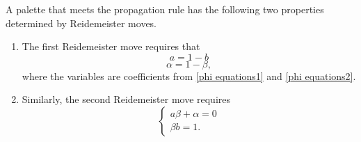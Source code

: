     \begin{lemma}\label{warunki na palete}
  A palette that meets the propagation rule has the following two properties determined by Reidemeister moves.
  \begin{enumerate}
    \item The first Reidemeister move requires that
      $$a=1-b$$
      $$\alpha=1-\beta,$$
      where the variables are coefficients from \eqref{phi equations1} and \eqref{phi equations2}.  
    \item Similarly, the second Reidemeister move requires
      $$\begin{cases}
        a\beta+\alpha=0\\ 
        \beta b=1.
      \end{cases}$$
  \end{enumerate}
\end{lemma}








